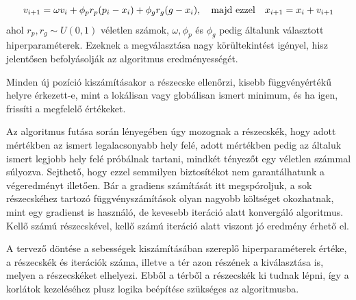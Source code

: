 \begin{equation}
	\label{eq:pso}
	v_{i+1}=\omega v_{i}+\phi _pr_p(p_{i}-x_{i})+\phi_gr_g(g-x_{i}), \quad\textnormal{majd ezzel}\quad x_{i+1}=x_i+v_{i+1}
\end{equation}
ahol $r_p, r_g \sim U(0,1)$ véletlen számok, $\omega, \phi_p$ és $\phi_g$ pedig általunk választott hiperparaméterek. Ezeknek a megválasztása nagy körültekintést igényel, hisz jelentősen befolyásolják az algoritmus eredményességét.

Minden új pozíció kiszámításakor a részecske ellenőrzi, kisebb függvényértékű helyre érkezett-e, mint a lokálisan vagy globálisan ismert minimum, és ha igen, frissíti a megfelelő értékeket.

Az algoritmus futása során lényegében úgy mozognak a részecskék, hogy adott mértékben az ismert legalacsonyabb hely felé, adott mértékben pedig az általuk ismert legjobb hely felé próbálnak tartani, mindkét tényezőt egy véletlen számmal súlyozva. Sejthető, hogy ezzel semmilyen biztosítékot nem garantálhatunk a végeredményt illetően. Bár a gradiens számítását itt megspóroljuk, a sok részecskéhez tartozó függvényszámítások olyan nagyobb költséget okozhatnak, mint egy gradienst is használó, de kevesebb iteráció alatt konvergáló algoritmus. Kellő számú részecskével, kellő számú iteráció alatt viszont jó eredmény érhető el.

A tervező döntése a sebességek kiszámításában szereplő hiperparaméterek értéke, a részecskék és iterációk száma, illetve a tér azon részének a kiválasztása is, melyen a részecskéket elhelyezi. Ebből a térből a részecskék ki tudnak lépni, így a korlátok kezeléséhez plusz logika beépítése szükséges az algoritmusba.

